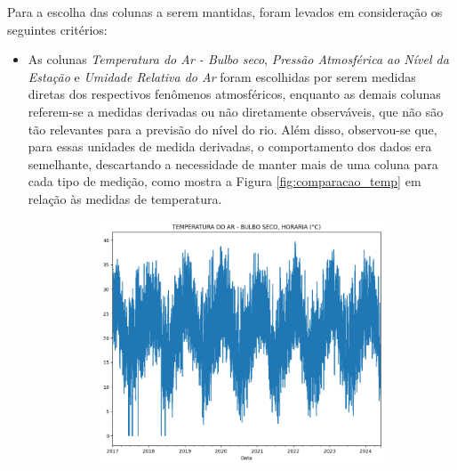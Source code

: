 Para a escolha das colunas a serem mantidas, foram levados em consideração os seguintes critérios:
\begin{itemize}
	\item As colunas \textit{Temperatura do Ar - Bulbo seco}, \textit{Pressão Atmosférica ao Nível da Estação} e \textit{Umidade Relativa do Ar} foram escolhidas por serem medidas diretas dos respectivos fenômenos atmosféricos, enquanto as demais colunas referem-se a medidas derivadas ou não diretamente observáveis, que não são tão relevantes para a previsão do nível do rio. Além disso, observou-se que, para essas unidades de medida derivadas, o comportamento dos dados era semelhante, descartando a necessidade de manter mais de uma coluna para cada tipo de medição, como mostra a Figura \ref{fig:comparacao_temp} em relação às medidas de temperatura.
	\begin{figure}[H]
	\caption{\label{fig:comparacao_temp}Comparativo de gráficos de temperatura em diferentes tipos de medição}
	\begin{center}
		\begin{subfigure}{0.35\textwidth}
			\includegraphics[width=\linewidth]{figuras/comparacao_temp_1.png}
		\end{subfigure}
		\begin{subfigure}{0.35\textwidth}

\end{subfigure}
\end{center}
\end{figure}
\end{itemize}
